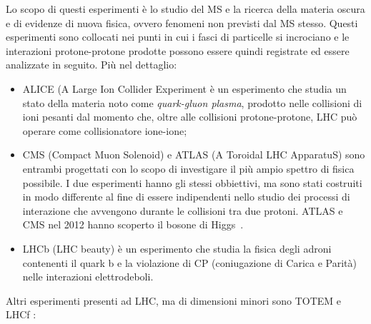 Lo scopo di questi esperimenti è lo studio del MS e la ricerca della materia oscura e di evidenze di nuova fisica, ovvero fenomeni non previsti dal MS stesso. Questi esperimenti sono collocati nei punti in cui i fasci di particelle si incrociano e le interazioni protone-protone prodotte possono essere quindi registrate ed essere analizzate in seguito. Pi\`u nel dettaglio:
\begin{itemize}
\item ALICE (A Large Ion Collider Experiment \`e un esperimento che studia un stato della materia noto come {\em quark-gluon plasma}, prodotto nelle collisioni di ioni pesanti dal momento che, oltre alle collisioni protone-protone, LHC pu\`o operare come collisionatore ione-ione;
\item CMS (Compact Muon Solenoid) e ATLAS (A Toroidal LHC ApparatuS) sono entrambi progettati con lo scopo di investigare il più ampio spettro di fisica possibile. I due esperimenti hanno gli stessi obbiettivi, ma sono stati costruiti in modo differente al fine di essere indipendenti nello studio dei processi di interazione che avvengono durante le collisioni tra due protoni. ATLAS e CMS nel 2012 hanno scoperto il bosone di Higgs~\cite{scopertahiggs}. 
\item LHCb (LHC beauty)  \`e un esperimento che studia la fisica degli adroni contenenti il quark b e la violazione di CP (coniugazione di Carica e Parità) nelle interazioni elettrodeboli.
\end{itemize}
Altri esperimenti presenti ad LHC, ma di dimensioni minori sono TOTEM \cite{Anelli:2008zza} e LHCf \cite{LHCf}:
